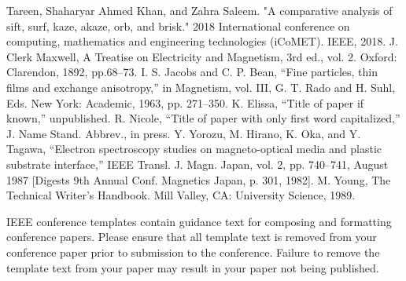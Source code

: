 \documentclass[conference]{IEEEtran}
\begin{document}
\begin{thebibliography}{00}
 Tareen, Shaharyar Ahmed Khan, and Zahra Saleem. "A comparative analysis of sift, surf, kaze, akaze, orb, and brisk." 2018 International conference on computing, mathematics and engineering technologies (iCoMET). IEEE, 2018.
 J. Clerk Maxwell, A Treatise on Electricity and Magnetism, 3rd ed., vol. 2. Oxford: Clarendon, 1892, pp.68--73.
 I. S. Jacobs and C. P. Bean, ``Fine particles, thin films and exchange anisotropy,'' in Magnetism, vol. III, G. T. Rado and H. Suhl, Eds. New York: Academic, 1963, pp. 271--350.
 K. Elissa, ``Title of paper if known,'' unpublished.
 R. Nicole, ``Title of paper with only first word capitalized,'' J. Name Stand. Abbrev., in press.
 Y. Yorozu, M. Hirano, K. Oka, and Y. Tagawa, ``Electron spectroscopy studies on magneto-optical media and plastic substrate interface,'' IEEE Transl. J. Magn. Japan, vol. 2, pp. 740--741, August 1987 [Digests 9th Annual Conf. Magnetics Japan, p. 301, 1982].
 M. Young, The Technical Writer's Handbook. Mill Valley, CA: University Science, 1989.
\end{thebibliography}
\vspace{12pt}
\color{red}
IEEE conference templates contain guidance text for composing and formatting conference papers. Please ensure that all template text is removed from your conference paper prior to submission to the conference. Failure to remove the template text from your paper may result in your paper not being published.
\end{document}
